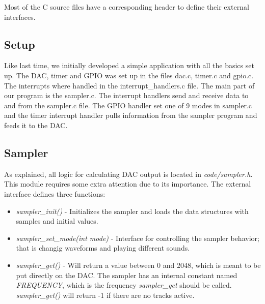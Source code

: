 Most of the C source files have a corresponding header to define their external interfaces.

\subsection{Setup}
Like last time, we initially developed a simple application with all the basics set up. The DAC, timer and GPIO was set up in the files dac.c, timer.c and gpio.c. The interrupts where handled in the interrupt\_handlers.c file. The main part of our program is the sampler.c. The interrupt handlers send and receive data to and from the sampler.c file. The GPIO handler set one of 9 modes in sampler.c and the timer interrupt handler pulls information from the sampler program and feeds it to the DAC.

\subsection{Sampler}
As explained, all logic for calculating DAC output is located in \emph{code/sampler.h}. This module requires some extra attention due to its importance. The external interface defines three functions:
\begin{itemize}
	\item \emph{sampler\_init()} - Initializes the sampler and loads the data structures with samples and initial values.
	\item \emph{sampler\_set\_mode(int mode)} - Interface for controlling the sampler behavior; that is changig waveforms and playing different sounds.
	\item \emph{sampler\_get()} - Will return a value between 0 and 2048, which is meant to be put directly on the DAC. The sampler has an internal constant named \emph{FREQUENCY}, which is the frequency \emph{sampler\_get} should be called. \emph{sampler\_get()} will return -1 if there are no tracks active.
\end{itemize}
